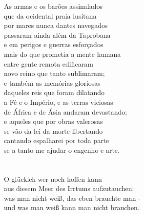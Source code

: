 \documentclass{minimal}
\begin{document}
As armas e os barões assinalados\\
que da ocidental praia lusitana\\
por mares nunca dantes navegados\\
passaram ainda além da Taprobana\\
e em perigos e guerras esforçados\\
mais do que prometia a mente humana\\
entre gente remota edificaram\\
novo reino que tanto sublimaram;\\ %

e também as memórias gloriosas\\
daqueles reis que foram dilatando\\
a Fé e o Império, e as terras viciosas\\
de África e de Ásia andaram devastando;\\
e aqueles que por obras valerosas\\
se vão da lei da morte libertando -\\
cantando espalharei por toda parte\\
se a tanto me ajudar o engenho e arte.\\\\\\

O glücklch wer noch hoffen kann\\
aus diesem Meer des Irrtums aufzutauchen:\\
was man nicht weiß, das eben brauchte man -\\
und was man weiß kann man nicht brauchen.


 
\end{document}
